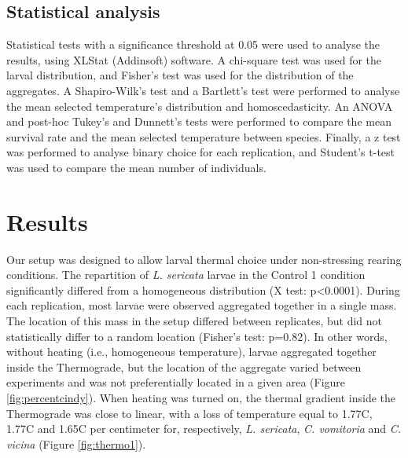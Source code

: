     	\subsection{Statistical analysis} 
Statistical tests with a significance threshold at 0.05 were used to analyse the results, using XLStat (Addinsoft) software. A chi-square test was used for the larval distribution, and Fisher’s test was used for the distribution of the aggregates. A Shapiro-Wilk’s test and a Bartlett’s test were performed to analyse the mean selected temperature’s distribution and homoscedasticity. An ANOVA and post-hoc Tukey’s and Dunnett’s tests were performed to compare the mean survival rate and the mean selected temperature between species. Finally, a z test was performed to analyse binary choice for each replication, and Student’s t-test was used to compare the mean number of individuals.


	\section{Results}  
Our setup was designed to allow larval thermal choice under non-stressing rearing conditions. The repartition of \textit{L. sericata} larvae in the Control 1 condition significantly differed from a homogeneous distribution (X test: p<0.0001). During each replication, most larvae were observed aggregated together in a single mass. The location of this mass in the setup differed between replicates, but did not statistically differ to a random location (Fisher's test: p=0.82). In other words, without heating (i.e., homogeneous temperature), larvae aggregated together inside the Thermograde, but the location of the aggregate varied between experiments and was not preferentially located in a given area (Figure \ref{fig:percentcindy}). 
When heating was turned on, the thermal gradient inside the Thermograde was close to linear, with a loss of temperature equal to 1.77C, 1.77C and 1.65C per centimeter for, respectively, \textit{L. sericata}, \textit{C. vomitoria} and \textit{C. vicina} (Figure \ref{fig:thermo1}). 

